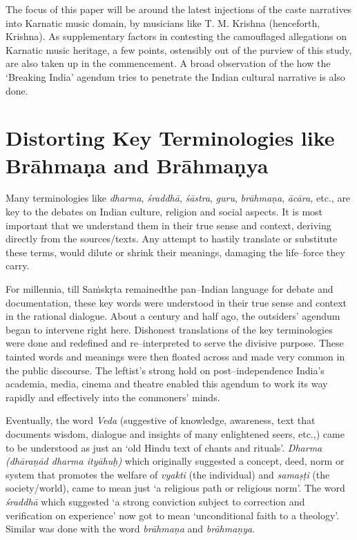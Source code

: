 The focus of this paper will be around the latest injections of the caste narratives into Karnatic music domain, by musicians like T. M. Krishna (henceforth, Krishna). As supplementary factors in contesting the camouflaged allegations on Karnatic music heritage, a few points, ostensibly out of the purview of this study, are also taken up in the commencement. A broad observation of the how the ‘Breaking India’ agendum tries to penetrate the Indian cultural narrative is also done.


\section*{Distorting Key Terminologies like Brāhmaṇa and Brāhmaṇya}

Many terminologies like \textit{dharma}, \textit{śraddhā}, \textit{śāstra}, \textit{guru}, \textit{brāhmaṇa}, \textit{ācāra,} etc., are key to the debates on Indian culture, religion and social aspects. It is most important that we understand them in their true sense and context, deriving directly from the sources/texts. Any attempt to hastily translate or substitute these terms, would dilute or shrink their meanings, damaging the life–force they carry.

For millennia, till Saṁskṛta remainedthe pan–Indian language for debate and documentation, these key words were understood in their true sense and context in the rational dialogue. About a century and half ago, the outsiders’ agendum began to intervene right here. Dishonest translations of the key terminologies were done and redefined and re–interpreted to serve the divisive purpose. These tainted words and meanings were then floated across and made very common in the public discourse. The leftist’s strong hold on post–independence India’s academia, media, cinema and theatre enabled this agendum to work its way rapidly and effectively into the commoners’ minds.

Eventually, the word \textit{Veda} (suggestive of knowledge, awareness, text that documents wisdom, dialogue and insights of many enlightened seers, etc.,) came to be understood as just an ‘old Hindu text of chants and rituals’. \textit{Dharma (dhāraṇād dharma ityāhuḥ)} which originally suggested a concept, deed, norm or system that promotes the welfare of \textit{vyakti} (the individual) and \textit{samaṣṭi} (the society/world), came to mean just ‘a religious path or religious norm’. The word \textit{śraddhā} which suggested ‘a strong conviction subject to correction and verification on experience’ now got to mean ‘unconditional faith to a theology’. Similar was done with the word \textit{brāhmaṇa} and \textit{brāhmaṇya}.

